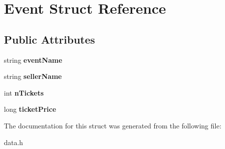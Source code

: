 \hypertarget{struct_event}{\section{Event Struct Reference}
\label{struct_event}
}
\subsection*{Public Attributes}
\begin{DoxyCompactItemize}
\item 
\hypertarget{struct_event_acf8fc6215a0eeaa049e2aca9a347f4b0}{string {\bfseries event\+Name}}\label{struct_event_acf8fc6215a0eeaa049e2aca9a347f4b0}

\item 
\hypertarget{struct_event_ad953d292a7ef9f83fb8ca15e11f3a891}{string {\bfseries seller\+Name}}\label{struct_event_ad953d292a7ef9f83fb8ca15e11f3a891}

\item 
\hypertarget{struct_event_aaa3dfcb8aa9dd835184fa56ef675caaa}{int {\bfseries n\+Tickets}}\label{struct_event_aaa3dfcb8aa9dd835184fa56ef675caaa}

\item 
\hypertarget{struct_event_a7b79606739eb7ec259f5c06843ddd93c}{long {\bfseries ticket\+Price}}\label{struct_event_a7b79606739eb7ec259f5c06843ddd93c}

\end{DoxyCompactItemize}


The documentation for this struct was generated from the following file\+:\begin{DoxyCompactItemize}
\item 
data.\+h\end{DoxyCompactItemize}
